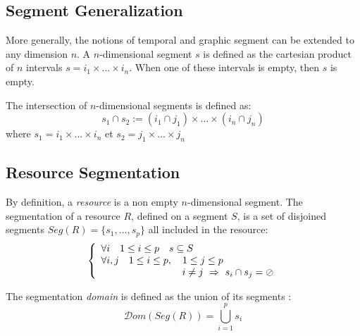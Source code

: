\documentclass[letterpaper, 12pt]{article}
\newcommand{\emptyseg}		{\ensuremath{\oslash}}
\newcommand{\domaine}			{{\mathcal Dom}}
\newcommand{\seg}[1]			{Seg(#1)}
\begin{document}
\subsection{Segment Generalization}
\label{segments}
More generally, the notions of temporal and graphic segment can be extended to any dimension $n$.
A $n$-dimensional segment $s$ is defined as the cartesian product of $n$ intervals $s = i_1\times ... \times i_n$. 
When one of these intervals is empty, then $s$ is empty.

The intersection of $n$-dimensional segments is defined as:
\begin{equation}
\label{eq:segintersect}
s_1 \cap s_2 := (i_1 \cap j_1) \times ... \times (i_n \cap j_n)
\end{equation} 
where $s_1 = i_1 \times ... \times i_n$ et $s_2 = j_1 \times ... \times j_n$


\subsection{Resource Segmentation}
\label{segmentation}


By definition, a \emph{resource} is a non empty $n$-dimensional segment. 
The segmentation of a resource $R$, defined on a segment $S$, is a set of disjoined segments
$\displaystyle{\seg{R}=\{ s_1,..., s_p\}}$ all included in the resource:
\begin{equation}
\label{eq:segmdef}
\left\{
\begin{array}{l}
	\forall i \quad 1 \leq i \leq p \quad s \subseteq S \\
	\forall i, j \quad 1 \leq i \leq p,\quad 1 \leq j \leq p \quad \\
	 \hspace{2.9cm} i \ne j\ \Rightarrow\  s_i \cap s_j =  \emptyseg	 \\
\end{array}
\right.
\end{equation}

The segmentation \emph{domain} is defined as the union of its segments :
$$ \domaine(\seg{R}) = \bigcup_{i=1}^p s_i $$
\end{document}
